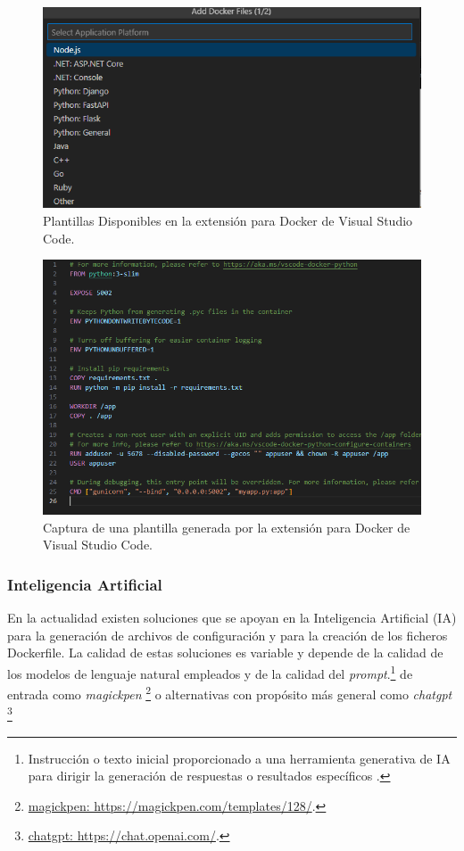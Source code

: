 \documentclass[12pt, a4paper, twoside]{article}
\begin{document}
\begin{figure}[ht]
	\centering
	  \includegraphics[width=1\textwidth]{Docker.extension.vscode.png}
	\caption{Plantillas Disponibles en la extensión para Docker de Visual Studio Code.}
\end{figure}

\begin{figure}[ht]
	\centering
		\includegraphics[width=1\textwidth]{docker.extension.vscode.Dockerfile.png}
	\caption{Captura de una plantilla generada por la extensión para Docker de Visual Studio Code.}
\end{figure}

\subsubsection{Inteligencia Artificial}
En la actualidad existen soluciones que se apoyan en la Inteligencia Artificial (IA) para la generación de archivos de configuración y para la creación de los ficheros Dockerfile. 
La calidad de estas soluciones es variable y depende de la calidad de los modelos de lenguaje natural empleados y de la calidad del \emph{prompt}.\footnote{Instrucción o texto inicial proporcionado a una herramienta generativa de IA para dirigir la generación de respuestas o resultados específicos \cite{panamericanlatam_prompt_ia}.} de entrada como \emph{magickpen} \cite{magickpen_Dockerfile_template}\footnote{\href{https://magickpen.com/templates/128/}{magickpen: https://magickpen.com/templates/128/}.} o alternativas con propósito más general como \emph{chatgpt} \cite{chatgpt} \footnote{\href{https://chat.openai.com/}{chatgpt: https://chat.openai.com/}.}
\end{document}
